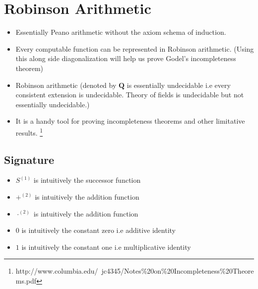 \documentclass[
11pt,notheorems,hyperref={pdfauthor=whatever}
]{beamer}
\begin{document}
\section{Robinson Arithmetic}
\begin{frame}
\begin{itemize}
    \item Essentially Peano arithmetic without the axiom schema of induction.
    \item Every computable function can be represented in Robinson arithmetic. \cite{odifreddi1992classical} (Using this along side diagonalization will help us prove Godel's incompleteness theorem)
    \item Robinson arithmetic (denoted by $\textbf{Q}$ is essentially undecidable i.e every consistent extension is undecidable. Theory of fields is undecidable but not essentially undecidable.)
    \item It is a handy tool for proving incompleteness theorems and other limitative results. \footnote{http://www.columbia.edu/~jc4345/Notes\%20on\%20Incompleteness\%20Theorems.pdf}
\end{itemize}
\end{frame}

\subsection{Signature}
\begin{frame}
\begin{itemize}
    \item $S^{(1)}$ is intuitively the successor function
    \item $+^{(2)}$ is intuitively the addition function
    \item $\cdot^{(2)}$ is intuitively the addition function
    \item $0$ is intuitively the constant zero i.e additive identity
    \item $1$ is intuitively the constant one i.e multiplicative identity
\end{itemize}
\end{frame}
\end{document}
